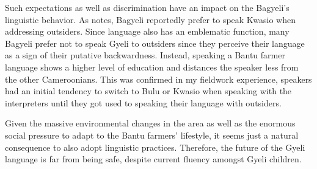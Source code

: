 Such expectations as well as discrimination have an impact on the Bagyeli's linguistic behavior.  As \citet[218]{ngima2001} notes,  Bagyeli reportedly prefer to speak Kwasio when addressing outsiders. Since language also has an emblematic function, many Bagyeli prefer not to speak Gyeli to outsiders since they perceive their language as a sign of their putative backwardness. Instead, speaking a Bantu farmer language shows a higher level of education and distances the speaker less from the other Cameroonians. This was confirmed in my fieldwork experience, speakers had an initial tendency to switch to Bulu or Kwasio when speaking with the interpreters until they got used to speaking their language with outsiders.

Given the massive environmental changes in the area as well as the enormous social pressure to adapt to the Bantu farmers' lifestyle, it seems just a natural consequence to also adopt linguistic practices. Therefore, the future of the Gyeli language is far from being safe, despite current fluency amongst Gyeli children.



